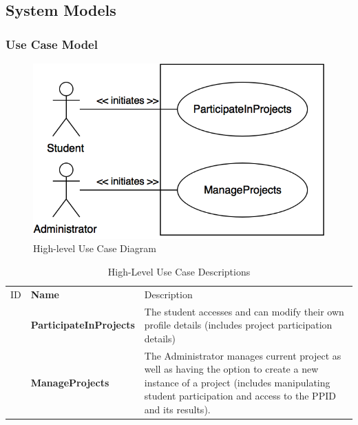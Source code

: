 \documentclass[12pt,letterpaper]{article}
\begin{document}
\subsection{System Models}

\subsubsection{Use Case Model}



\begin{figure}[H]
	\centering{}
	\includegraphics[scale=0.3]{imgs/high-level-use-case-diagram.png}
	\caption{High-level Use Case Diagram}
\end{figure}

\begin{table}[H]
	\caption{High-Level Use Case Descriptions}
	\vspace{1em}
	\begin{tabu} to 
	    \tableheader{}ID & Name & Description\\
		\participateinprojects{} & ParticipateInProjects & The student accesses and can modify their own profile details 
		(includes project participation details)\\
		\manageprojects{} & ManageProjects & The Administrator manages current project as well as having the option to 
		create a new instance of a project (includes manipulating student participation and access to the PPID and its results). \\
	\end{tabu}
\end{table}
\end{document}
